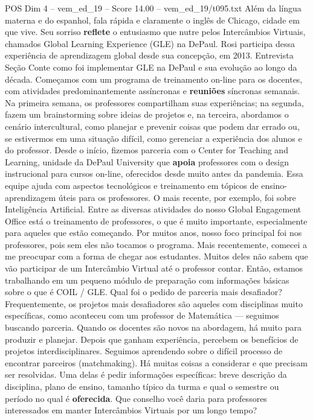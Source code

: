 \begin{textsample}{POS Dim 4 – vem\_ed\_19 – Score 14.00 – vem\_ed\_19/t095.txt}
Além da língua materna e do espanhol, fala rápida e claramente o inglês de Chicago, cidade em que vive.
Seu sorriso \textbf{reflete} o entusiasmo que nutre pelos Intercâmbios Virtuais, chamados Global Learning Experience (GLE) na DePaul.
Rosi participa dessa experiência de aprendizagem global desde sua concepção, em 2013.
Entrevista Seção Conte como foi implementar GLE na DePaul e sua evolução ao longo da década.
Começamos com um programa de treinamento on-line para os docentes, com atividades predominantemente assíncronas e \textbf{reuniões} síncronas semanais.
Na primeira semana, os professores compartilham suas experiências; na segunda, fazem um brainstorming sobre ideias de projetos e, na terceira, abordamos o cenário intercultural, como planejar e prevenir coisas que podem dar errado ou, se estivermos em uma situação difícil, como gerenciar a experiência dos alunos e do professor.
Desde o início, fizemos parceria com o Center for Teaching and Learning, unidade da DePaul University que \textbf{apoia} professores com o design instrucional para cursos on-line, oferecidos desde muito antes da pandemia.
Essa equipe ajuda com aspectos tecnológicos e treinamento em tópicos de ensino-aprendizagem úteis para os professores.
O mais recente, por exemplo, foi sobre Inteligência Artificial.
Entre as diversas atividades do nosso Global Engagement Office está o treinamento de professores, o que é muito importante, especialmente para aqueles que estão começando.
Por muitos anos, nosso foco principal foi nos professores, pois sem eles não tocamos o programa.
Mais recentemente, comecei a me preocupar com a forma de chegar aos estudantes.
Muitos deles não sabem que vão participar de um Intercâmbio Virtual até o professor contar.
Então, estamos trabalhando em um pequeno módulo de preparação com informações básicas sobre o que é COIL / GLE.
Qual foi o pedido de parceria mais desafiador?
Frequentemente, os projetos mais desafiadores são aqueles com disciplinas muito específicas, como aconteceu com um professor de Matemática — seguimos buscando parceria.
Quando os docentes são novos na abordagem, há muito para produzir e planejar.
Depois que ganham experiência, percebem os benefícios de projetos interdisciplinares.
Seguimos aprendendo sobre o difícil processo de encontrar parceiros (matchmaking).
Há muitas coisas a considerar e que precisam ser resolvidas.
Uma delas é pedir informações específicas: breve descrição da disciplina, plano de ensino, tamanho típico da turma e qual o semestre ou período no qual é \textbf{oferecida}.
Que conselho você daria para professores interessados em manter Intercâmbios Virtuais por um longo tempo?

\end{textsample}

